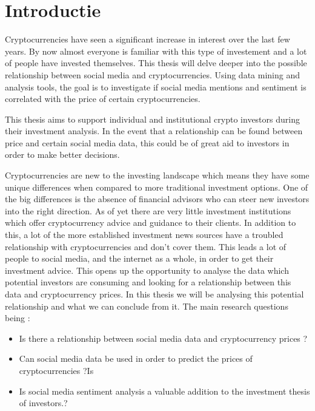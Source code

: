 
\section{Introductie}%
\label{sec:introductie}

\noindent Cryptocurrencies have seen a significant increase in interest over the last few years. By now almost everyone is familiar with this type of investement and a lot of people have invested themselves. This thesis will delve deeper into the possible relationship between social media and cryptocurrencies. Using data mining and analysis tools, the goal is to investigate if social media mentions and sentiment is correlated with the price of certain cryptocurrencies.  

\noindent This thesis aims to support individual and institutional crypto investors during their investment analysis. In the event that a relationship can be found between price and certain social media data, this could be of great aid to investors in order to make better decisions. 

\noindent Cryptocurrencies are new to the investing landscape which means they have some unique differences when compared to more traditional investment options. One of the big differences is the absence of financial advisors who can steer new investors into the right direction. As of yet there are very little investment institutions which offer cryptocurrency advice and guidance to their clients. In addition to this, a lot of the more established investment news sources have a troubled relationship with cryptocurrencies and don't cover them. This leads a lot of people to social media, and the internet as a whole, in order to get their investment advice. This opens up the opportunity to analyse the data which potential investors are consuming and looking for a relationship between this data and cryptocurrency prices. In this thesis we will be analysing this potential relationship and what we can conclude from it. The main research questions being :

\begin{itemize}
    \item Is there a relationship between social media data and cryptocurrency prices ?
    \item Can social media data be used in order to predict the prices of cryptocurrencies ?Is
    \item Is social media sentiment analysis a valuable addition to the investment thesis of investors.?
\end{itemize}




